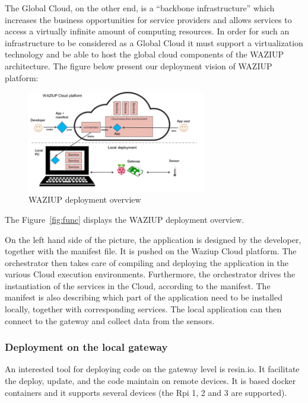 The Global Cloud, on the other end, is a “backbone infrastructure” which increases the business opportunities for service providers and allows services to access a virtually infinite amount of computing resources. 
In order for such an infrastructure to be considered as a Global Cloud it must support a virtualization technology and be able to host the global cloud components of the WAZIUP architecture.
The figure below present our deployment vision of WAZIUP platform:

\begin{figure}[h!]
\centering
\includegraphics[width=0.7\textwidth]{figs/deploy.png}
\caption{WAZIUP deployment overview}
\label{fig:deploy}
\end{figure}

The Figure~\ref{fig:func} displays the WAZIUP deployment overview.

On the left hand side of the picture, the application is designed by the developer, together with the manifest file. 
It is pushed on the Waziup Cloud platform. The orchestrator then takes care of compiling and deploying the application in the various Cloud execution environments. 
Furthermore, the orchestrator drives the instantiation of the services in the Cloud, according to the manifest. 
The manifest is also describing which part of the application need to be installed locally, together with corresponding services. 
The local application can then connect to the gateway and collect data from the sensors.

\subsubsection{Deployment on the local gateway}
An interested tool for deploying code on the gateway level is resin.io.
It facilitate the deploy, update, and the code maintain on remote devices. 
It is based docker containers and it supports several devices (the Rpi 1, 2 and 3 are supported).


